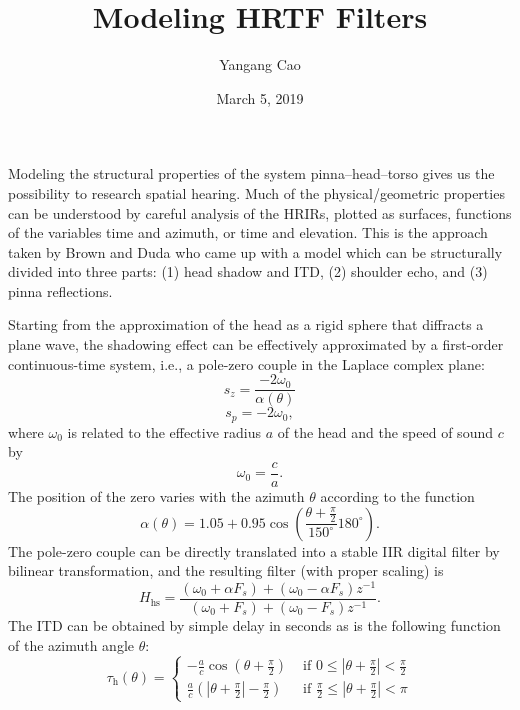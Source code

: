 \documentclass[10pt,a4paper,oneside]{article}
\author{Yangang Cao}
\date{March 5, 2019}
\begin{document}
\title{Modeling HRTF Filters}
\maketitle 

Modeling the structural properties of the system pinna–head–torso gives us the possibility to research spatial hearing. Much of the physical/geometric properties can be understood by careful analysis of the HRIRs, plotted as surfaces, functions of the variables time and azimuth, or time and elevation. This is the approach taken by Brown and Duda who came up with a model which can be structurally divided into three parts: (1) head shadow and ITD, (2) shoulder echo, and (3) pinna reflections.

Starting from the approximation of the head as a rigid sphere that diffracts a plane wave, the shadowing effect can be effectively approximated by a first-order continuous-time system, i.e., a pole-zero couple in the Laplace complex plane:
\[
{s_{z}=\frac{-2 \omega_{0}}{\alpha(\theta)}} 
\]
\[
s_{p}=-2 \omega_{0},
\]
where $\omega_0$ is related to the effective radius $a$ of the head and the speed of sound $c$ by
\[
\omega_{0}=\frac{c}{a}.
\]
The position of the zero varies with the azimuth $\theta$ according to the function
\[
\alpha(\theta)=1.05+0.95 \cos \left(\frac{\theta+\frac{\pi}{2}}{150^{\circ}} 180^{\circ}\right).
\]
The pole-zero couple can be directly translated into a stable IIR digital filter by bilinear transformation, and the resulting filter (with proper scaling) is
\[
H_{\mathrm{hs}}=\frac{\left(\omega_{0}+\alpha F_{s}\right)+\left(\omega_{0}-\alpha F_{s}\right) z^{-1}}{\left(\omega_{0}+F_{s}\right)+\left(\omega_{0}-F_{s}\right) z^{-1}}.
\]
The ITD can be obtained by simple delay in seconds as is the following function of the azimuth angle $\theta$:
\[
\tau_{\mathrm{h}}(\theta)=\left\{\begin{array}{ll}{-\frac{a}{c} \cos \left(\theta+\frac{\pi}{2}\right)} & {\text { if } 0 \leq\left|\theta+\frac{\pi}{2}\right|<\frac{\pi}{2}} \\ {\frac{a}{c}\left(\left|\theta+\frac{\pi}{2}\right|-\frac{\pi}{2}\right)} & {\text { if } \frac{\pi}{2} \leq\left|\theta+\frac{\pi}{2}\right|<\pi}\end{array}\right.
\]
\end{document}
